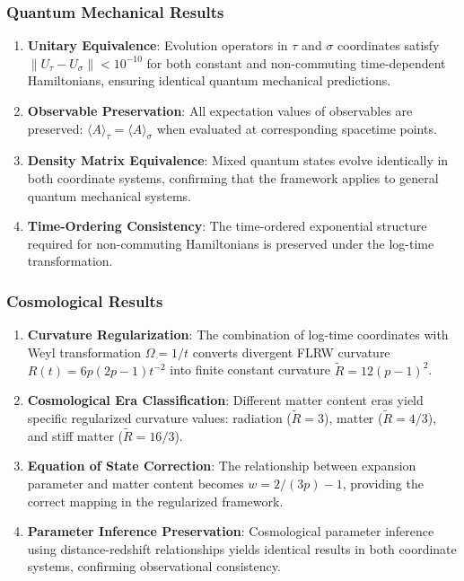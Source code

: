 \subsubsection{Quantum Mechanical Results}

\begin{enumerate}
\item \textbf{Unitary Equivalence}: Evolution operators in $\tau$ and $\sigma$ coordinates satisfy $\|U_\tau - U_\sigma\| < 10^{-10}$ for both constant and non-commuting time-dependent Hamiltonians, ensuring identical quantum mechanical predictions.

\item \textbf{Observable Preservation}: All expectation values of observables are preserved: $\langle A \rangle_\tau = \langle A \rangle_\sigma$ when evaluated at corresponding spacetime points.

\item \textbf{Density Matrix Equivalence}: Mixed quantum states evolve identically in both coordinate systems, confirming that the framework applies to general quantum mechanical systems.

\item \textbf{Time-Ordering Consistency}: The time-ordered exponential structure required for non-commuting Hamiltonians is preserved under the log-time transformation.
\end{enumerate}

\subsubsection{Cosmological Results}

\begin{enumerate}
\item \textbf{Curvature Regularization}: The combination of log-time coordinates with Weyl transformation $\Omega = 1/t$ converts divergent FLRW curvature $R(t) = 6p(2p-1)t^{-2}$ into finite constant curvature $\tilde{R} = 12(p-1)^2$.

\item \textbf{Cosmological Era Classification}: Different matter content eras yield specific regularized curvature values: radiation ($\tilde{R} = 3$), matter ($\tilde{R} = 4/3$), and stiff matter ($\tilde{R} = 16/3$).

\item \textbf{Equation of State Correction}: The relationship between expansion parameter and matter content becomes $w = 2/(3p) - 1$, providing the correct mapping in the regularized framework.

\item \textbf{Parameter Inference Preservation}: Cosmological parameter inference using distance-redshift relationships yields identical results in both coordinate systems, confirming observational consistency.
\end{enumerate}

